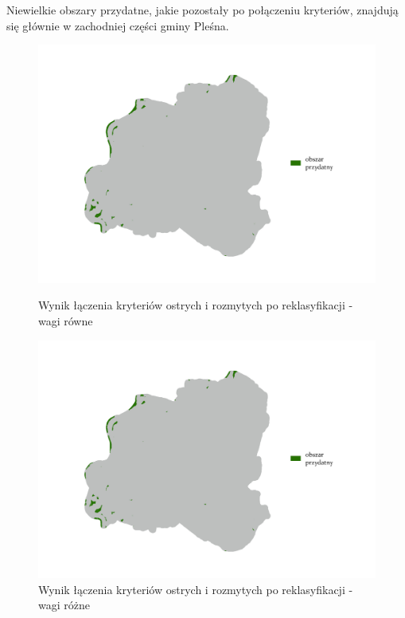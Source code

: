 \documentclass{article}
\begin{document}
Niewielkie obszary przydatne, jakie pozostały po połączeniu kryteriów, znajdują się głównie w zachodniej części gminy Pleśna.

\begin{figure}[H]
    \begin{minipage}[t]{0.48\textwidth}
        \centering
        \includegraphics[width=\linewidth]{img/plesna-wynik-po-reklasyfikacji.jpg}
        \caption{Wynik łączenia kryteriów ostrych i rozmytych po reklasyfikacji - wagi równe}
        \label{fig:wynik-reklasyfikacja-rowne}
    \end{minipage}
    \hfill
    \begin{minipage}[t]{0.48\textwidth}
        \centering
        \includegraphics[width=\linewidth]{img/roznewagi-plesna-wynik-po-reklasyfikacji.jpg}
        \caption{Wynik łączenia kryteriów ostrych i rozmytych po reklasyfikacji - wagi różne}
        \label{fig:wynik-reklasyfikacja-rozne}
    \end{minipage}
\end{figure}
\vspace{10pt}
\end{document}
